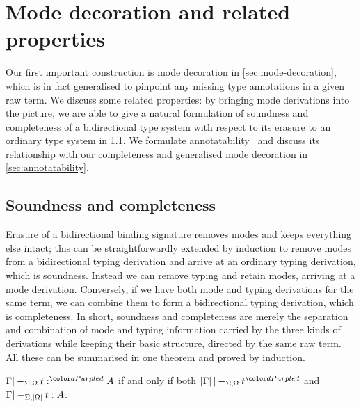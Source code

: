 
\section{Mode decoration and related properties}\label{sec:pre-synthesis}

Our first important construction is mode decoration in \cref{sec:mode-decoration}, which is in fact generalised to pinpoint any missing type annotations in a given raw term.
We discuss some related properties: by bringing mode derivations into the picture, we are able to give a natural formulation of soundness and completeness of a bidirectional type system with respect to its erasure to an ordinary type system in \cref{sec:soundness-and-completeness}.
We formulate annotatability~\cite{Dunfield2021} and discuss its relationship with our completeness and generalised mode decoration in \cref{sec:annotatability}.

\subsection{Soundness and completeness}
\label{sec:soundness-and-completeness}


Erasure of a bidirectional binding signature removes modes and keeps everything else intact; this can be straightforwardly extended by induction to remove modes from a bidirectional typing derivation and arrive at an ordinary typing derivation, which is soundness.
Instead we can remove typing and retain modes, arriving at a mode derivation.
Conversely, if we have both mode and typing derivations for the same term, we can combine them to form a bidirectional typing derivation, which is completeness.
In short, soundness and completeness are merely the separation and combination of mode and typing information carried by the three kinds of derivations while keeping their basic structure, directed by the same raw term.
All these can be summarised in one theorem and proved by induction.

\begin{theorem}\label{lem:soundness-completeness}
$\Gamma |-_{\Sigma, \Omega} t :^\dir{d} A$ if and only if both\/ $\erase\Gamma |-_{\Sigma, \Omega} t^\dir{d}$ and\/ $\Gamma |-_{\Sigma, \left|\Omega\right|} t : A$.
\end{theorem}

